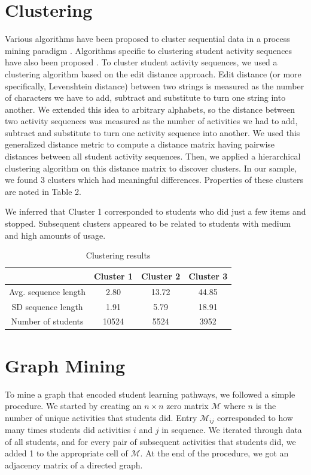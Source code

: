 \documentclass{edm_template}
\begin{document}
\section{Clustering}
Various algorithms have been proposed to cluster sequential data in a process mining paradigm \cite{bose2009context}. Algorithms specific to clustering student activity sequences have also been proposed \cite{klingler2016temporally}. To cluster student activity sequences, we used a clustering algorithm based on the edit distance approach. Edit distance (or more specifically, Levenshtein distance) between two strings is measured as the number of characters we have to add, subtract and substitute to turn one string into another. We extended this idea to arbitrary alphabets, so the distance between two activity sequences was measured as the number of activities we had to add, subtract and substitute to turn one activity sequence into another. We used this generalized distance metric to compute a distance matrix having pairwise distances between all student activity sequences. Then, we applied a hierarchical clustering algorithm on this distance matrix to discover clusters. In our sample, we found 3 clusters which had meaningful differences. Properties of these clusters are noted in Table 2.

We inferred that Cluster 1 corresponded to students who did just a few items and stopped. Subsequent clusters appeared to be related to students with medium and high amounts of usage.

\begin{table}
\centering
\caption{Clustering results}
\begin{tabular}{ c | c c c } \hline
                     & Cluster 1 & Cluster 2 & Cluster 3 \\ \hline
Avg. sequence length & 2.80       & 13.72      & 44.85      \\
SD sequence length   & 1.91      & 5.79       & 18.91      \\
Number of students   & 10524     & 5524      & 3952      \\
\hline \end{tabular}
\end{table}

\section{Graph Mining}
To mine a graph that encoded student learning pathways, we followed a simple procedure. We started by creating an $n \times n$ zero matrix $\mathcal{M}$ where $n$ is the number of unique activities that students did. Entry $\mathcal{M}_{ij}$ corresponded to how many times students did activities $i$ and $j$ in sequence. We iterated through data of all students, and for every pair of subsequent activities that students did, we added 1 to the appropriate cell of $\mathcal{M}$. At the end of the procedure, we got an adjacency matrix of a directed graph.
\end{document}
